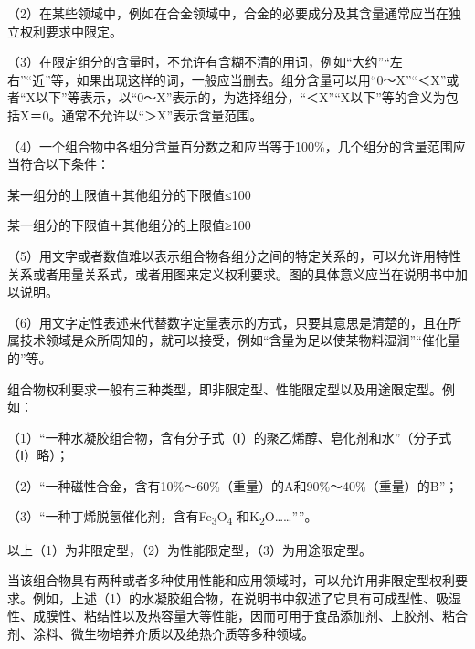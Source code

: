 {\setlength{\parindent}{17.1bp}（2）在某些领域中，例如在合金领域中，合金的必要成分及其含量通常应当在独立权利要求中限定。\par}

{\setlength{\parindent}{17.1bp}（3）在限定组分的含量时，不允许有含糊不清的用词，例如“大约”“左右”“近”等，如果出现这样的词，一般应当删去。组分含量可以用“0～X”“＜X”或者“X以下”等表示，以“0～X”表示的，为选择组分，“＜X”“X以下”等的含义为包括X＝0。通常不允许以“＞X”表示含量范围。\par}

{\setlength{\parindent}{17.1bp}（4）一个组合物中各组分含量百分数之和应当等于100\%，几个组分的含量范围应当符合以下条件：\par}

某一组分的上限值＋其他组分的下限值≤100

某一组分的下限值＋其他组分的上限值≥100

{\setlength{\parindent}{17.1bp}（5）用文字或者数值难以表示组合物各组分之间的特定关系的，可以允许用特性关系或者用量关系式，或者用图来定义权利要求。图的具体意义应当在说明书中加以说明。\par}

{\setlength{\parindent}{17.1bp}（6）用文字定性表述来代替数字定量表示的方式，只要其意思是清楚的，且在所属技术领域是众所周知的，就可以接受，例如“含量为足以使某物料湿润”“催化量的”等。\par}

组合物权利要求一般有三种类型，即非限定型、性能限定型以及用途限定型。例如：

{\setlength{\parindent}{17.1bp}（1）“一种水凝胶组合物，含有分子式（Ⅰ）的聚乙烯醇、皂化剂和水”（分子式（Ⅰ）略）；\par}

{\setlength{\parindent}{17.1bp}（2）“一种磁性合金，含有10\%～60\%（重量）的A和90\%～40\%（重量）的B”；\par}

{\setlength{\parindent}{17.1bp}（3）“一种丁烯脱氢催化剂，含有Fe\textsubscript{3}O\textsubscript{4} 和K\textsubscript{2}O……””。\par}

以上（1）为非限定型，（2）为性能限定型，（3）为用途限定型。

当该组合物具有两种或者多种使用性能和应用领域时，可以允许用非限定型权利要求。例如，上述（1）的水凝胶组合物，在说明书中叙述了它具有可成型性、吸湿性、成膜性、粘结性以及热容量大等性能，因而可用于食品添加剂、上胶剂、粘合剂、涂料、微生物培养介质以及绝热介质等多种领域。

